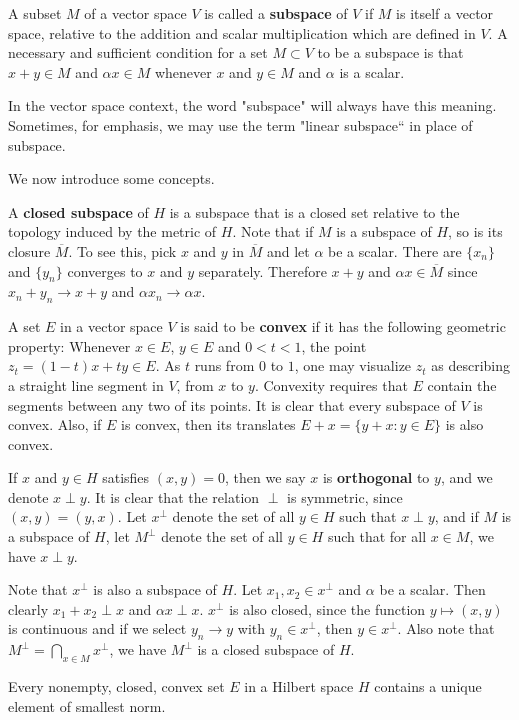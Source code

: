 A subset $M$ of a vector space $V$ is called a \textbf{subspace} of $V$ if $M$ is itself a vector space, relative to the addition and scalar multiplication which are defined in $V$. A necessary and sufficient condition for a set $M\subset V$ to be a subspace is that $x+y\in M$ and $\alpha x\in M$ whenever $x$ and $y\in M$ and $\alpha$ is a scalar.\par
In the vector space context, the word "subspace" will always have this meaning. Sometimes, for emphasis, we may use the term "linear subspace“ in place of subspace.\par
We now introduce some concepts.\par
A \textbf{closed subspace} of $H$ is a subspace that is a closed set relative to the topology induced by the metric of $H$. Note that if $M$ is a subspace of $H$, so is its closure $\overline{M}$. To see this, pick $x$ and $y$ in $\overline{M}$ and let $\alpha$ be a scalar. There are $\{x_n\}$ and $\{y_n\}$ converges to $x$ and $y$ separately. Therefore $x+y$ and $\alpha x\in\overline{M}$ since $x_n+y_n\to x+y$ and $\alpha x_n\to\alpha x$.\par
A set $E$ in a vector space $V$ is said to be \textbf{convex} if it has the following geometric property: Whenever $x\in E$, $y\in E$ and $0<t<1$, the point $z_t=(1-t)x+ty\in E$. As $t$ runs from $0$ to $1$, one may visualize $z_t$ as describing a straight line segment in $V$, from $x$ to $y$. Convexity requires that $E$ contain the segments between any two of its points. It is clear that every subspace of $V$ is convex. Also, if $E$ is convex, then its translates $E+x=\{y+x:y\in E\}$ is also convex.\par
If $x$ and $y\in H$ satisfies $(x,y)=0$, then we say $x$ is \textbf{orthogonal} to $y$, and we denote $x\perp y$. It is clear that the relation $\perp$ is symmetric, since $(x,y)=(y,x)$. Let $x^\perp$ denote the set of all $y\in H$ such that $x\perp y$, and if $M$ is a subspace of $H$, let $M^\perp$ denote the set of all $y\in H$ such that for all $x\in M$, we have $x\perp y$.\par
Note that $x^\perp$ is also a subspace of $H$. Let $x_1,x_2\in x^\perp$ and $\alpha$ be a scalar. Then clearly $x_1+x_2\perp x$ and $\alpha x\perp x$. $x^\perp$ is also closed, since the function $y\mapsto(x,y)$ is continuous and if we select $y_n\to y$ with $y_n\in x^\perp$, then $y\in x^\perp$. Also note that $M^\perp=\bigcap_{x\in M}x^\perp$, we have $M^\perp$ is a closed subspace of $H$.
\begin{theorem}
Every nonempty, closed, convex set $E$ in a Hilbert space $H$ contains a unique element of smallest norm.
\end{theorem}
